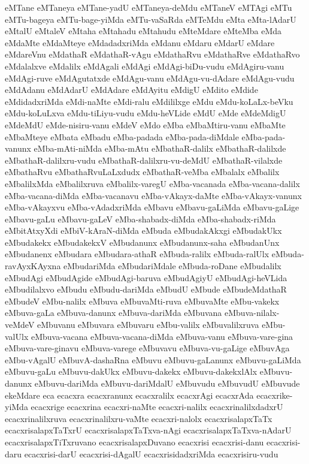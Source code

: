 {eMTane
eMTaneya
eMTane-yadU
eMTaneya-deMdu
eMTaneV
eMTAgi
eMTu
eMTu-bageya
eMTu-bage-yiMda
eMTu-vaSaRda
eMTeMdu
eMta
eMta-lAdarU
eMtalU
eMtaleV
eMtaha
eMtahadu
eMtahudu
eMteMdare
eMteMba
eMda
eMdaMte
eMdaMteye
eMdadadxriMda
eMdanu
eMdaru
eMdarU
eMdare
eMdareVnu
eMdathaR
eMdathaR-vAgu
eMdathaRvu
eMdathaRve
eMdathaRvo
eMdalalxve
eMdalilx
eMdAgali
eMdAgi
eMdAgi-biDu-vudu
eMdAgiru-vanu
eMdAgi-ruve
eMdAgutatxde
eMdAgu-vanu
eMdAgu-vu-dAdare
eMdAgu-vudu
eMdAdanu
eMdAdarU
eMdAdare
eMdAyitu
eMdigU
eMdito
eMdide
eMdidadxriMda
eMdi-naMte
eMdi-ralu
eMdililxge
eMdu
eMdu-koLaLx-beVku
eMdu-koLuLxva
eMdu-tiLiyu-vudu
eMdu-heVLide
eMdU
eMde
eMdeMdigU
eMdeMdU
eMde-nisiru-vanu
eMdeV
eMdo
eMba
eMbaMtiru-vanu
eMbaMte
eMbaMteye
eMbata
eMbadu
eMba-padada
eMba-pada-diMdale
eMba-pada-vanunx
eMba-mAti-niMda
eMba-mAtu
eMbathaR-dalilx
eMbathaR-dalilxde
eMbathaR-dalilxru-vudu
eMbathaR-dalilxru-vu-deMdU
eMbathaR-vilalxde
eMbathaRvu
eMbathaRvuLaLxdudx
eMbathaR-veMba
eMbalalx
eMbalilx
eMbalilxMda
eMbalilxruva
eMbalilx-varegU
eMba-vacanada
eMba-vacana-dalilx
eMba-vacana-diMda
eMba-vacanavu
eMba-vAkayx-daMte
eMba-vAkayx-vanunx
eMba-vAkayxvu
eMba-vAdadxriMda
eMbavu
eMbavu-gaLiMda
eMbavu-gaLige
eMbavu-gaLu
eMbavu-gaLeV
eMba-shabadx-diMda
eMba-shabadx-riMda
eMbitAtxyXdi
eMbiV-kAraN-diMda
eMbuda
eMbudakAkxgi
eMbudakUkx
eMbudakekx
eMbudakekxV
eMbudanunx
eMbudanunx-saha
eMbudanUnx
eMbudanenx
eMbudara
eMbudara-athaR
eMbuda-ralilx
eMbuda-ralUlx
eMbuda-ravAyxKAyxna
eMbudariMda
eMbudariMdale
eMbuda-roDane
eMbudalilx
eMbudAgi
eMbudAgide
eMbudAgi-baruva
eMbudAgiyU
eMbudAgi-heVLida
eMbudilalxvo
eMbudu
eMbudu-dariMda
eMbudU
eMbude
eMbudeMdathaR
eMbudeV
eMbu-nalilx
eMbuva
eMbuvaMti-ruva
eMbuvaMte
eMbu-vakekx
eMbuva-gaLa
eMbuva-danunx
eMbuva-dariMda
eMbuvana
eMbuva-nilalx-veMdeV
eMbuvanu
eMbuvara
eMbuvaru
eMbu-valilx
eMbuvalilxruva
eMbu-valUlx
eMbuva-vacana
eMbuva-vacana-diMda
eMbuva-vanu
eMbuva-vare-gina
eMbuva-vare-ginavu
eMbuva-varege
eMbuvavu
eMbuva-vu-gaLige
eMbuvAga
eMbu-vAgalU
eMbuvA-dashaRna
eMbuvu
eMbuvu-gaLanunx
eMbuvu-gaLiMda
eMbuvu-gaLu
eMbuvu-dakUkx
eMbuvu-dakekx
eMbuvu-dakekxlAlx
eMbuvu-danunx
eMbuvu-dariMda
eMbuvu-dariMdalU
eMbuvudu
eMbuvudU
eMbuvude
ekeMdare
eca
ecacxra
ecacxranunx
ecacxralilx
ecacxrAgi
ecacxrAda
ecacxrike-yiMda
ecacxrige
ecacxrina
ecacxri-naMte
ecacxri-nalilx
ecacxrinalilxdadxrU
ecacxrinalilxruva
ecacxrinalilxru-vaMte
ecacxri-nalolx
ecacxrisalapxTaTx
ecacxrisalapxTaTxrU
ecacxrisalapxTaTxva-nAgi
ecacxrisalapxTaTxva-nAdarU
ecacxrisalapxTiTxruvano
ecacxrisalapxDuvano
ecacxrisi
ecacxrisi-danu
ecacxrisi-daru
ecacxrisi-darU
ecacxrisi-dAgalU
ecacxrisidadxriMda
ecacxrisiru-vudu
}
